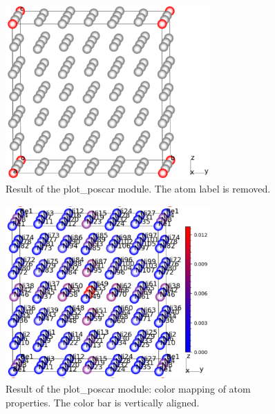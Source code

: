 \documentclass[12pt]{book}
\begin{document}
\begin{figure}[htbp]
\centering
\includegraphics[width=0.7\textwidth]{outputs_plot_poscar2.pdf}
\caption{Result of the plot\_poscar module. The atom label is removed.}
\label{fig:outputs_plot_poscar2}
\end{figure}

\begin{figure}[htbp]
\centering
\includegraphics[width=0.7\textwidth]{outputs_colormapping1.pdf}
\caption{Result of the plot\_poscar module: color mapping of atom properties. The color bar is vertically aligned.}
\label{fig:outputs_colormapping1}
\end{figure}
\end{document}
